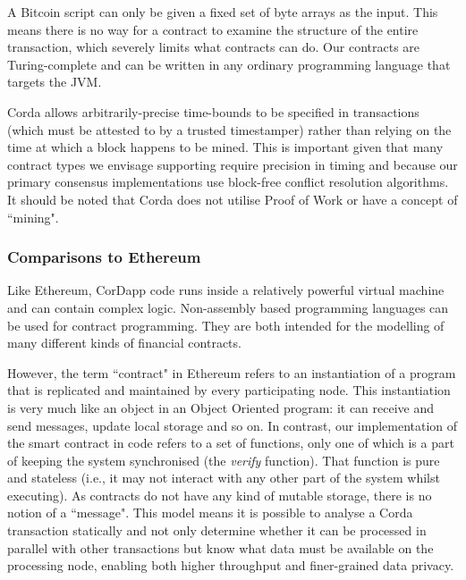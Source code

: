 \documentclass{article}
\begin{document}
A Bitcoin script can only be given a fixed set of byte arrays as the input. This means there is no way for a contract to examine the structure of the entire transaction, which severely limits what contracts can do. Our contracts are Turing-complete and can be written in any ordinary programming language that targets the JVM.

Corda allows arbitrarily-precise time-bounds to be specified in transactions (which must be attested to by a trusted timestamper) rather than relying on the time at which a block happens to be mined.  This is important given that many contract types we envisage supporting require precision in timing and because our primary consensus implementations use block-free conflict resolution algorithms. It should be noted that Corda does not utilise Proof of Work or have a concept of ``mining".



\subsubsection{Comparisons to Ethereum}
Like Ethereum, CorDapp code runs inside a relatively powerful virtual machine and can contain complex logic. Non-assembly based programming languages can be used for contract programming.  They are both intended for the modelling of many different kinds of financial contracts.

However, the term ``contract" in Ethereum refers to an instantiation of a program that is replicated and maintained by every participating node. This instantiation is very much like an object in an Object Oriented program: it can receive and send messages, update local storage and so on. In contrast, our implementation of the smart contract in code refers to a set of functions, only one of which is a part of keeping the system synchronised (the \textit{verify} function). That function is pure and stateless (i.e., it may not interact with any other part of the system whilst executing).	As contracts do not have any kind of mutable storage, there is no notion of a ``message". This model means it is possible to analyse a Corda transaction statically and not only determine whether it can be processed in parallel with other transactions but know what data must be available on the processing node, enabling both higher throughput and finer-grained data privacy.
\end{document}
